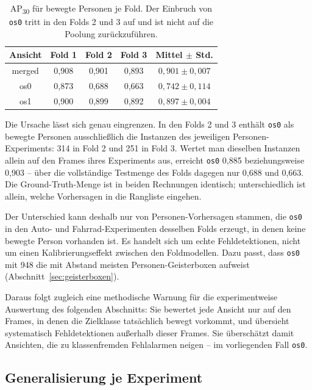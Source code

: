 \begin{table}[H]
\centering
\begin{tabular}{ccccc}
\toprule
\textbf{Ansicht} & \textbf{Fold 1} & \textbf{Fold 2} & \textbf{Fold 3} & \textbf{Mittel \(\pm\) Std.} \\
\midrule
merged & 0{,}908 & 0{,}901 & 0{,}893 & \(0{,}901 \pm 0{,}007\) \\
os0    & 0{,}873 & 0{,}688 & 0{,}663 & \(0{,}742 \pm 0{,}114\) \\
os1    & 0{,}900 & 0{,}899 & 0{,}892 & \(0{,}897 \pm 0{,}004\) \\
\bottomrule
\end{tabular}
\caption{AP\textsubscript{30} für bewegte Personen je Fold. Der Einbruch von \texttt{os0} tritt in den Folds 2 und 3 auf und ist nicht auf die Poolung zurückzuführen.}
\label{tab:os0-person-folds}
\end{table}

Die Ursache lässt sich genau eingrenzen. In den Folds 2 und 3 enthält \texttt{os0} als bewegte Personen ausschließlich die Instanzen des jeweiligen Personen-Experiments: 314 in Fold 2 und 251 in Fold 3. Wertet man dieselben Instanzen allein auf den Frames ihres Experiments aus, erreicht \texttt{os0} 0{,}885 beziehungsweise 0{,}903 -- über die vollständige Testmenge des Folds dagegen nur 0{,}688 und 0{,}663. Die Ground-Truth-Menge ist in beiden Rechnungen identisch; unterschiedlich ist allein, welche Vorhersagen in die Rangliste eingehen.

Der Unterschied kann deshalb nur von Personen-Vorhersagen stammen, die \texttt{os0} in den Auto- und Fahrrad-Experimenten desselben Folds erzeugt, in denen keine bewegte Person vorhanden ist. Es handelt sich um echte Fehldetektionen, nicht um einen Kalibrierungseffekt zwischen den Foldmodellen. Dazu passt, dass \texttt{os0} mit 948 die mit Abstand meisten Personen-Geisterboxen aufweist (Abschnitt~\ref{sec:geisterboxen}).

Daraus folgt zugleich eine methodische Warnung für die experimentweise Auswertung des folgenden Abschnitts: Sie bewertet jede Ansicht nur auf den Frames, in denen die Zielklasse tatsächlich bewegt vorkommt, und übersieht systematisch Fehldetektionen außerhalb dieser Frames. Sie überschätzt damit Ansichten, die zu klassenfremden Fehlalarmen neigen -- im vorliegenden Fall \texttt{os0}.

\subsection{Generalisierung je Experiment}
\label{sec:generalisierung-experiment}


